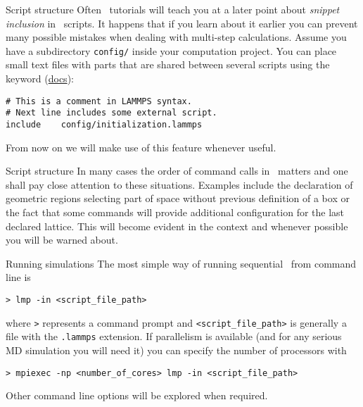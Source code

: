 \begin{frame}[fragile]{\secname}{Script structure}
Often \LAMMPS\ tutorials will teach you at a later point about \emph{snippet inclusion} in \LAMMPS\ scripts. It happens that if you learn about it earlier you can prevent many possible mistakes when dealing with multi-step calculations. Assume you have a subdirectory \Verb|config/| inside your computation project. You can place small text files with parts that are shared between several scripts using the keyword  (\href{https://docs.lammps.org/include.html}{docs}):

\vspace{1cm}

\begin{lstlisting}[language={LAMMPS}]
# This is a comment in LAMMPS syntax.
# Next line includes some external script.
include    config/initialization.lammps
\end{lstlisting}

\vspace{1cm}

From now on we will make use of this feature whenever useful.
\end{frame}

\begin{frame}{\secname}{Script structure}
In many cases the order of command calls in \LAMMPS\ matters and one shall pay close attention to these situations. Examples include the declaration of geometric regions selecting part of space without previous definition of a box or the fact that some commands will provide additional configuration for the last declared lattice. This will become evident in the context and whenever possible you will be warned about.
\end{frame}

\begin{frame}[fragile]{\secname}{Running simulations}
The most simple way of running sequential \LAMMPS\ from command line is

\begin{verbatim}
> lmp -in <script_file_path>
\end{verbatim}

\noindent{}where \Verb|>| represents a command prompt and \Verb|<script_file_path>| is generally a file with the \Verb|.lammps| extension. If parallelism is available (and for any serious MD simulation you will need it) you can specify the number of processors with

\begin{verbatim}
> mpiexec -np <number_of_cores> lmp -in <script_file_path>
\end{verbatim}

Other command line options will be explored when required.
\end{frame}

\endinput
